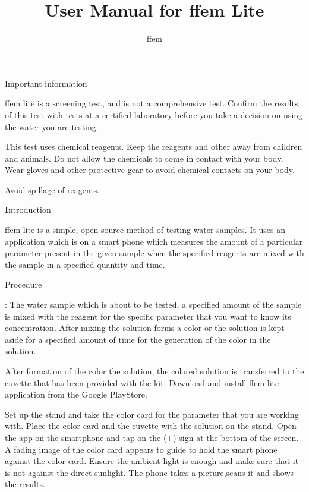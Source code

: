 \documentclass{article}
\title{User Manual for ffem Lite }
\author{ffem}
\begin{document}
    \maketitle
    
       
 \begin{large}
 Important information 
 \end{large}

ffem lite is a screening test, and is not a comprehensive test. Confirm the results of this test with tests at a certified laboratory before you take a decision on using the water you are testing.

This test uses chemical reagents. Keep the reagents and other away from children and animals. Do not allow the chemicals to come in contact with your body. Wear gloves and other protective gear to avoid chemical contacts on your body.

 Avoid spillage of reagents.


    \begin{huge}
    \textbf Introduction
    \end{huge}
   
  
ffem lite is a simple, open source method of testing water samples. It uses an application which is on a smart phone which measures the amount of a particular parameter present in the given sample when the specified reagents are mixed with the sample in a specified quantity and time.

\begin{large}
Procedure
\end{large}:
The water sample which is about to be tested, a specified amount of the sample is mixed with the reagent for the specific parameter that you want to know its concentration. After mixing the solution forms a color or the solution is kept aside for a specified amount of time for the generation of the color in the solution.

After formation of the color the solution, the colored solution is transferred to the cuvette that has been provided with the kit. Download and install ffem lite application from the Google PlayStore.

Set up the stand and take the color card for the parameter that you are working with. Place the color card and the cuvette with the solution on the stand.
 Open the app on the smartphone and tap on the (+) sign at the bottom of the screen. A fading image of the color card appears to guide to hold the smart phone against the color card. Ensure the ambient light is enough and make sure that it is not against the direct sunlight.
  The phone takes a picture,scans it and shows the results.
\end{document}
